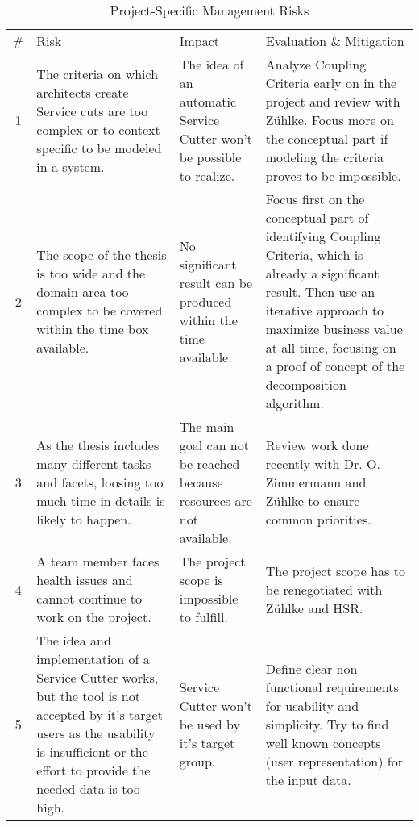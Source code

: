 \begin{table}[H]
\begin{tabular}{|c|p{120pt} p{100pt} p{140pt}|}
\hline \# & Risk & Impact & Evaluation \& Mitigation \\ 
1 & The criteria on which architects create Service cuts are too complex or to context specific to be modeled in a system. & The idea of an automatic Service Cutter won't be possible to realize. & Analyze Coupling Criteria early on in the project and review with Z\"uhlke. Focus more on the conceptual part if modeling the criteria proves to be impossible. \\
2 & The scope of the thesis is too wide and the domain area too complex to be covered within the time box available. & No significant result can be produced within the time available. & Focus first on the conceptual part of identifying Coupling Criteria, which is already a significant result. Then use an iterative approach to maximize business value at all time, focusing on a proof of concept of the decomposition algorithm. \\
3 & As the thesis includes many different tasks and facets, loosing too much time in details is likely to happen. & The main goal can not be reached because resources are not available. & Review work done recently with Dr. O. Zimmermann and Z\"uhlke to ensure common priorities. \\
4 & A team member faces health issues and cannot continue to work on the project. & The project scope is impossible to fulfill. & The project scope has to be renegotiated with Z\"uhlke and HSR. \\ 
5 & The idea and implementation of a Service Cutter works, but the tool is not accepted by it's target users as the usability is insufficient or the effort to provide the needed data is too high. & Service Cutter won't be used by it's target group. & Define clear non functional requirements for usability and simplicity. Try to find well known concepts (user representation) for the input data. \\
\hline
\end{tabular}
\caption{Project-Specific Management Risks}
\label{tab:projmgmtrisks}
\end{table}

